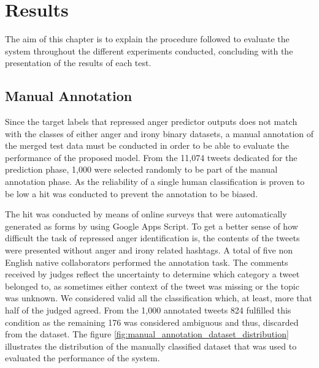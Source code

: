 \chapter{Results}

The aim of this chapter is to explain the procedure followed to evaluate the system throughout the different experiments conducted, concluding with the presentation of the results of each test.

\section{Manual Annotation}

Since the target labels that repressed anger predictor outputs does not match with the classes of either anger and irony binary datasets, a manual annotation of the merged test data must be conducted in order to be able to evaluate the performance of the proposed model. From the 11,074 tweets dedicated for the prediction phase, 1,000 were selected randomly to be part of the manual annotation phase. As the reliability of a single human classification is proven to be low \cite{gonzalez2011identifying} a \acrshort{hit} was conducted to prevent the annotation to be biased.

The \acrshort{hit} was conducted by means of online surveys that were automatically generated as forms by using Google Apps Script. To get a better sense of how difficult the task of repressed anger identification is, the contents of the tweets were presented without anger and irony related hashtags. A total of five non English native collaborators performed the annotation task. The comments received by judges reflect the uncertainty to determine which category a tweet belonged to, as sometimes either context of the tweet was missing or the topic was unknown. We considered valid all the classification which, at least, more that half of the judged agreed. From the 1,000 annotated tweets 824 fulfilled this condition as the remaining 176 was considered ambiguous and thus, discarded from the dataset. The figure \ref{fig:manual_annotation_dataset_distribution} illustrates the distribution of the manually classified dataset that was used to evaluated the performance of the system.

